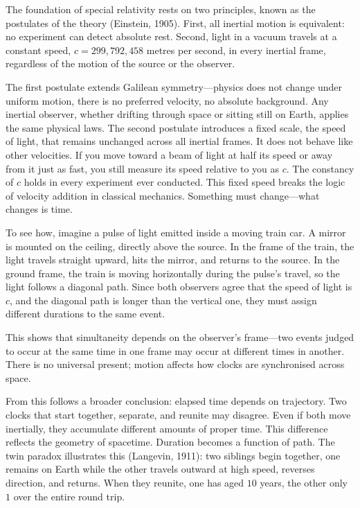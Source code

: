 The foundation of special relativity rests on two principles, known as the postulates of the theory (Einstein, 1905). First, all inertial motion is equivalent: no experiment can detect absolute rest. Second, light in a vacuum travels at a constant speed, $c = 299{,}792{,}458$ metres per second, in every inertial frame, regardless of the motion of the source or the observer. 

The first postulate extends Galilean symmetry—physics does not change under uniform motion, there is no preferred velocity, no absolute background. Any inertial observer, whether drifting through space or sitting still on Earth, applies the same physical laws. The second postulate introduces a fixed scale, the speed of light, that remains unchanged across all inertial frames. It does not behave like other velocities. If you move toward a beam of light at half its speed or away from it just as fast, you still measure its speed relative to you as $c$. The constancy of $c$ holds in every experiment ever conducted. This fixed speed breaks the logic of velocity addition in classical mechanics. Something must change—what changes is time.

To see how, imagine a pulse of light emitted inside a moving train car. A mirror is mounted on the ceiling, directly above the source. In the frame of the train, the light travels straight upward, hits the mirror, and returns to the source. In the ground frame, the train is moving horizontally during the pulse's travel, so the light follows a diagonal path. Since both observers agree that the speed of light is $c$, and the diagonal path is longer than the vertical one, they must assign different durations to the same event.

This shows that simultaneity depends on the observer's frame—two events judged to occur at the same time in one frame may occur at different times in another. There is no universal present; motion affects how clocks are synchronised across space.

From this follows a broader conclusion: elapsed time depends on trajectory. Two clocks that start together, separate, and reunite may disagree. Even if both move inertially, they accumulate different amounts of proper time. This difference reflects the geometry of spacetime. Duration becomes a function of path. The twin paradox illustrates this (Langevin, 1911): two siblings begin together, one remains on Earth while the other travels outward at high speed, reverses direction, and returns. When they reunite, one has aged $10$ years, the other only $1$ over the entire round trip.

